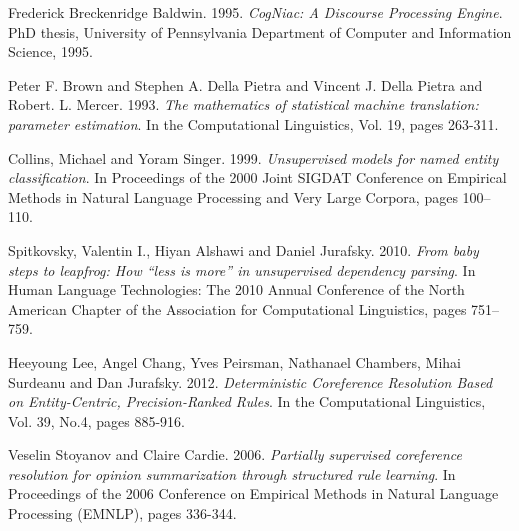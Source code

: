 \documentclass[12pt]{extarticle}
\begin{document}
\begin{thebibliography}{30}
	Frederick Breckenridge Baldwin. 1995.
	\textit{CogNiac: A Discourse Processing Engine}.
	PhD thesis, University of Pennsylvania Department of Computer and Information Science, 1995.

	Peter F. Brown and Stephen A. Della Pietra and Vincent J. Della Pietra and Robert. L. Mercer. 1993.
	\textit{The mathematics of statistical machine translation: parameter estimation}.
	In the Computational Linguistics,  Vol. 19, pages 263-311.

	Collins, Michael and Yoram Singer. 1999.
	\textit{Unsupervised models for named entity classification}.
	In Proceedings of the 2000 Joint SIGDAT Conference on Empirical Methods in Natural Language Processing and Very Large Corpora, pages 100–110.

	Spitkovsky, Valentin I., Hiyan Alshawi and Daniel Jurafsky. 2010.
	\textit{From baby steps to leapfrog: How “less is more” in unsupervised dependency parsing}.
	In Human Language Technologies: The 2010 Annual Conference of the North American Chapter of the Association for Computational Linguistics, pages 751–759.

	Heeyoung Lee, Angel Chang, Yves Peirsman, Nathanael Chambers, Mihai Surdeanu and Dan Jurafsky. 2012.
	\textit{Deterministic Coreference Resolution Based on Entity-Centric, Precision-Ranked Rules}.
	In the Computational Linguistics,  Vol. 39, No.4, pages 885-916.

	Veselin Stoyanov and Claire Cardie. 2006.
	\textit{Partially supervised coreference resolution for opinion summarization through structured rule learning}.
	In Proceedings of the 2006 Conference on Empirical Methods in Natural Language
	Processing (EMNLP), pages 336-344.
 
\end{thebibliography}	
\end{document}

